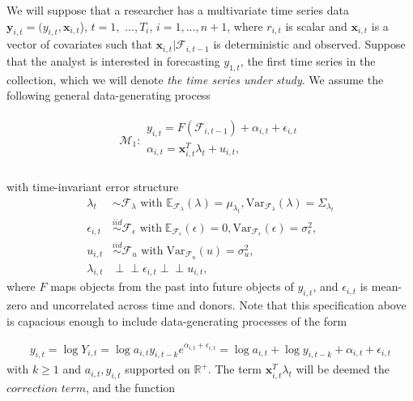 \documentclass[11pt]{article}
\newcommand{\y}{\textbf{y}}
\newcommand{\x}{\textbf{x}}
\newcommand{\simiid}{\stackrel{iid}{\sim}} %
\newcommand{\indep}{\perp \!\!\! \perp } %
\def\mrm#1{\mathrm{#1}} %
\def\mc#1{\mathcal{#1}} %
\def\E{\mathbb{E}} %
\def\mc#1{\mathcal{#1}}
\theoremstyle{definition}
\begin{document}
We will suppose that a researcher has a multivariate time series data $\y_{i,t} = (y_{i,t}, \x_{i,t}$), $t = 1,$ $\ldots,  T_i$, $i = 1, \ldots, n+1$, where $r_{i,t}$ is scalar and $\x_{i,t}$ is a vector of covariates such that $\x_{i,t}|\mathcal{F}_{i,t-1}$ is deterministic and observed.  Suppose that the analyst is interested in forecasting $y_{1,t}$, the first time series in the collection, which we will denote \textit{the time series under study}.   We assume the following general data-generating process

  \begin{align}
    \mc{M}_1 \colon \begin{array}{l}
      y_{i,t} = F(\mathcal{F}_{i,t-1}) + \alpha_{i,t} + \epsilon_{i,t}\\[.2cm]\label{core_specification}
      \alpha_{i,t} = \x^{T}_{i,t}\lambda_{t} + u_{i,t},\\
    \end{array}
    \end{align}
   
with time-invariant error structure
  \begin{align*}
    \lambda_{t} &\sim \mc{F}_{\lambda}\text{ with }  \E_{\mathcal{F}_{\lambda}}(\lambda) = \mu_{\lambda_{t}}, \mrm{Var}_{\mc{F}_{\lambda}}(\lambda) = \Sigma_{\lambda_{t}}\\
    \epsilon_{i,t} &\simiid \mc{F}_{\epsilon} \text{ with}  \; \E_{\mc{F}_{\epsilon}}(\epsilon) = 0, \mrm{Var}_{\mc{F}_{\epsilon}}(\epsilon)  = \sigma^{2}_{\epsilon},  \\
    u_{i,t} & \simiid  \mc{F}_{u} \text{ with}  \; \mrm{Var}_{\mc{F}_{u}}(u) = \sigma^2_{u},\\
    \lambda_{i,t} & \indep \epsilon_{i,t}  \indep u_{i,t},
    \end{align*}
where $F$ maps objects from the past into future objects of $y_{i,t}$, and $\epsilon_{i,t}$ is mean-zero and uncorrelated across time and donors.  Note that this specification above is capacious enough to include data-generating processes of the form 

\begin{align*} 
  y_{i,t} = \log{Y_{i,t}} = \log{a_{i,t}y_{i,t-k}e^{\alpha_{i,t}+\epsilon_{i,t}}} = \log{a_{i,t}} + \log{y_{i, t-k}} + \alpha_{i,t} + \epsilon_{i,t}
\end{align*}
with $k\geq1$ and $a_{i,t}, y_{i,t}$ supported on $\mathbb{R}^{+}$.  The term $\x^{T}_{i,t}\lambda_{t}$ will be deemed the $\textit{correction term}$, and the function
\end{document}
